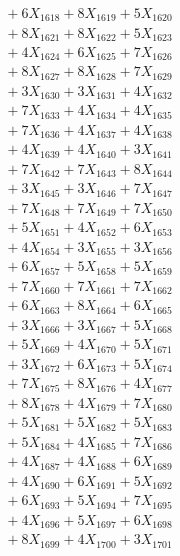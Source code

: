 \documentclass[a4paper,10pt]{article}
\begin{document}
{\begin{align}
&\;  + 6 X_{1618} + 8 X_{1619} + 5 X_{1620} \\[0.3ex]
&\;  + 8 X_{1621} + 8 X_{1622} + 5 X_{1623} \\[0.3ex]
&\;  + 4 X_{1624} + 6 X_{1625} + 7 X_{1626} \\[0.3ex]
&\;  + 8 X_{1627} + 8 X_{1628} + 7 X_{1629} \\[0.5ex]\allowbreak
&\;  + 3 X_{1630} + 3 X_{1631} + 4 X_{1632} \\[0.3ex]
&\;  + 7 X_{1633} + 4 X_{1634} + 4 X_{1635} \\[0.3ex]
&\;  + 7 X_{1636} + 4 X_{1637} + 4 X_{1638} \\[0.3ex]
&\;  + 4 X_{1639} + 4 X_{1640} + 3 X_{1641} \\[0.3ex]
&\;  + 7 X_{1642} + 7 X_{1643} + 8 X_{1644} \\[0.3ex]
&\;  + 3 X_{1645} + 3 X_{1646} + 7 X_{1647} \\[0.3ex]
&\;  + 7 X_{1648} + 7 X_{1649} + 7 X_{1650} \\[0.3ex]
&\;  + 5 X_{1651} + 4 X_{1652} + 6 X_{1653} \\[0.3ex]
&\;  + 4 X_{1654} + 3 X_{1655} + 3 X_{1656} \\[0.3ex]
&\;  + 6 X_{1657} + 5 X_{1658} + 5 X_{1659} \\[0.5ex]\allowbreak
&\;  + 7 X_{1660} + 7 X_{1661} + 7 X_{1662} \\[0.3ex]
&\;  + 6 X_{1663} + 8 X_{1664} + 6 X_{1665} \\[0.3ex]
&\;  + 3 X_{1666} + 3 X_{1667} + 5 X_{1668} \\[0.3ex]
&\;  + 5 X_{1669} + 4 X_{1670} + 5 X_{1671} \\[0.3ex]
&\;  + 3 X_{1672} + 6 X_{1673} + 5 X_{1674} \\[0.3ex]
&\;  + 7 X_{1675} + 8 X_{1676} + 4 X_{1677} \\[0.3ex]
&\;  + 8 X_{1678} + 4 X_{1679} + 7 X_{1680} \\[0.3ex]
&\;  + 5 X_{1681} + 5 X_{1682} + 5 X_{1683} \\[0.3ex]
&\;  + 5 X_{1684} + 4 X_{1685} + 7 X_{1686} \\[0.3ex]
&\;  + 4 X_{1687} + 4 X_{1688} + 6 X_{1689} \\[0.5ex]\allowbreak
&\;  + 4 X_{1690} + 6 X_{1691} + 5 X_{1692} \\[0.3ex]
&\;  + 6 X_{1693} + 5 X_{1694} + 7 X_{1695} \\[0.3ex]
&\;  + 4 X_{1696} + 5 X_{1697} + 6 X_{1698} \\[0.3ex]
&\;  + 8 X_{1699} + 4 X_{1700} + 3 X_{1701} \\[0.3ex]

\end{align}}
\end{document}
